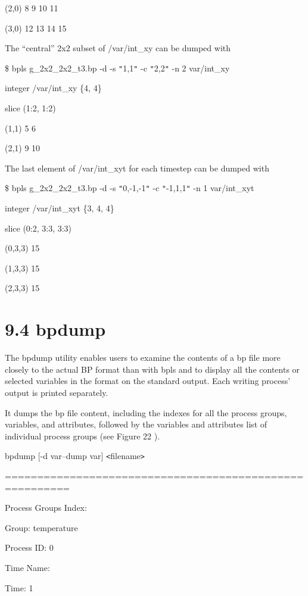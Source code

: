 (2,0)    8 9 10 11 

(3,0)    12 13 14 15

\parindent=0pt
The ``central'' 2x2 subset of /var/int\_xy can be dumped with

\$ bpls g\_2x2\_2x2\_t3.bp -d -s \texttt{"}1,1\texttt{"} -c \texttt{"}2,2\texttt{"} 
-n 2 var/int\_xy

\parindent=7pt
integer    /var/int\_xy    \{4, 4\}

\parindent=14pt
slice (1:2, 1:2)

(1,1)    5 6 

(2,1)    9 10

\parindent=0pt
The last element of /var/int\_xyt for each timestep can be dumped with

\$ bpls g\_2x2\_2x2\_t3.bp -d -s \texttt{"}0,-1,-1\texttt{"} -c \texttt{"}-1,1,1\texttt{"} 
-n 1 var/int\_xyt

\parindent=7pt
integer    /var/int\_xyt   \{3, 4, 4\}

\parindent=14pt
slice (0:2, 3:3, 3:3)

(0,3,3)    15 

(1,3,3)    15 

(2,3,3)    15\label{HToc182553429}

\section*{{\large 9.4 }{\large \textbf{bpdump}}}

\parindent=0pt
The bpdump utility enables users to examine the contents of a bp file more closely 
to the actual BP format than with bpls and to display all the contents or selected 
variables in the format on the standard output. Each writing process' output is 
printed separately. 

\parindent=3pt
It dumps the bp file content, including the indexes for all the process groups, 
variables, and attributes, followed by the variables and attributes list of individual 
process groups (see Figure 22 ).

\parindent=0pt
bpdump [-d var\textbar{}--dump var] \texttt{<}filename\texttt{>}

========================================================

Process Groups Index:

Group: temperature

\parindent=28pt
Process ID: 0

Time Name:

\parindent=57pt
Time: 1

